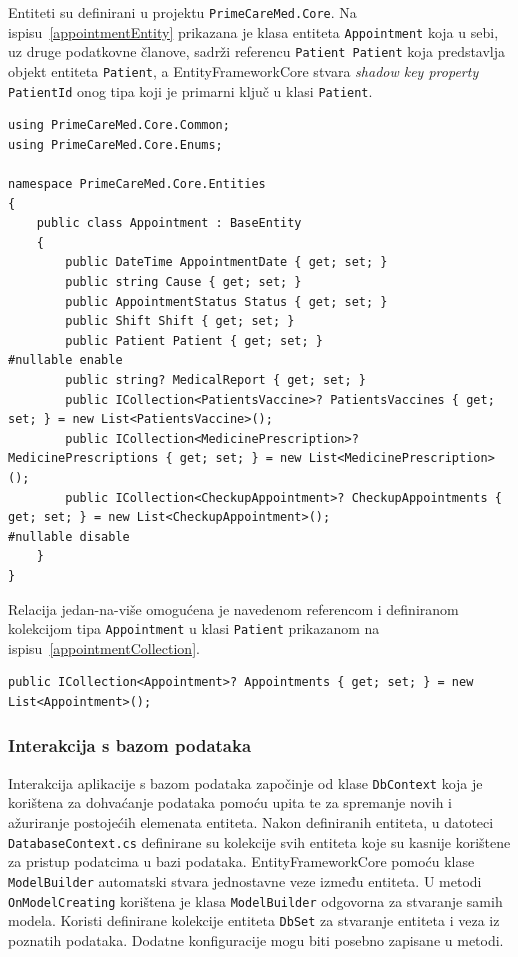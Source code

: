 Entiteti su definirani u projektu \texttt{PrimeCareMed.Core}.
Na ispisu~\ref{appointmentEntity} prikazana je klasa entiteta \texttt{Appointment} koja u sebi, uz druge podatkovne članove, sadrži referencu \texttt{Patient Patient} koja predstavlja objekt entiteta \texttt{Patient}, a EntityFrameworkCore stvara \textit{shadow key property} \texttt{PatientId} onog tipa koji je primarni ključ u klasi \texttt{Patient}. 
\begin{lstlisting}[caption={Entitet \texttt{Appointment}}, label=appointmentEntity]
using PrimeCareMed.Core.Common;
using PrimeCareMed.Core.Enums;

namespace PrimeCareMed.Core.Entities
{
    public class Appointment : BaseEntity
    {
        public DateTime AppointmentDate { get; set; }
        public string Cause { get; set; }
        public AppointmentStatus Status { get; set; }
        public Shift Shift { get; set; }
        public Patient Patient { get; set; }
#nullable enable
        public string? MedicalReport { get; set; }
        public ICollection<PatientsVaccine>? PatientsVaccines { get; set; } = new List<PatientsVaccine>();
        public ICollection<MedicinePrescription>? MedicinePrescriptions { get; set; } = new List<MedicinePrescription>();
        public ICollection<CheckupAppointment>? CheckupAppointments { get; set; } = new List<CheckupAppointment>();
#nullable disable
    }
}
\end{lstlisting}
Relacija jedan-na-više\cite{oneToMany} omogućena je navedenom referencom i definiranom kolekcijom tipa \texttt{Appointment} u klasi \texttt{Patient} prikazanom na ispisu~\ref{appointmentCollection}.
\begin{lstlisting}[caption={Kolekcija objekata \texttt{Appointment} u klasi Patient}, label=appointmentCollection]
public ICollection<Appointment>? Appointments { get; set; } = new List<Appointment>();
\end{lstlisting}

\subsubsection{Interakcija s bazom podataka}
Interakcija aplikacije s bazom podataka započinje od klase \texttt{DbContext} koja je korištena za dohvaćanje podataka pomoću upita te za spremanje novih i ažuriranje postojećih elemenata entiteta. Nakon definiranih entiteta, u datoteci \texttt{DatabaseContext.cs} definirane su kolekcije svih entiteta koje su kasnije korištene za pristup podatcima u bazi podataka. EntityFrameworkCore pomoću klase \texttt{ModelBuilder} automatski stvara jednostavne veze između entiteta. U metodi \texttt{OnModelCreating} korištena je klasa \texttt{ModelBuilder} odgovorna za stvaranje samih modela. Koristi definirane kolekcije entiteta \texttt{DbSet} za stvaranje entiteta i veza iz poznatih podataka. Dodatne konfiguracije mogu biti posebno zapisane u metodi.

